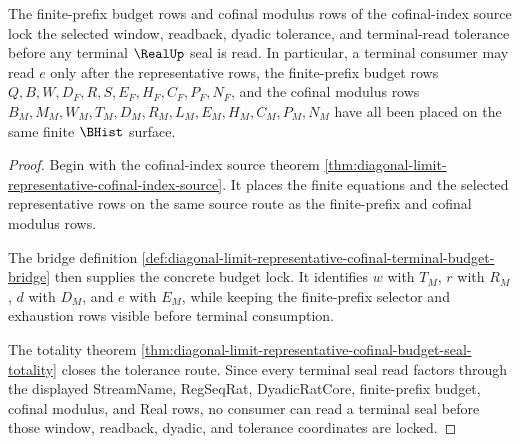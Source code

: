 \begin{theorem}
\label{thm:diagonal-limit-representative-cofinal-index-budget-lock}
The finite-prefix budget rows and cofinal modulus rows of the cofinal-index source lock the selected window, readback, dyadic tolerance, and terminal-read tolerance before any terminal $\RealUp$ seal is read. In particular, a terminal consumer may read $e$ only after the representative rows, the finite-prefix budget rows $Q,B,W,D_F,R,S,E_F,H_F,C_F,P_F,N_F$, and the cofinal modulus rows $B_M,M_M,W_M,T_M,D_M,R_M,L_M,E_M,H_M,C_M,P_M,N_M$ have all been placed on the same finite $\BHist$ surface.
\end{theorem}
\begin{proof}
Begin with the cofinal-index source theorem \autoref{thm:diagonal-limit-representative-cofinal-index-source}. It places the finite equations and the selected representative rows on the same source route as the finite-prefix and cofinal modulus rows.

The bridge definition \autoref{def:diagonal-limit-representative-cofinal-terminal-budget-bridge} then supplies the concrete budget lock. It identifies $w$ with $T_M$, $r$ with $R_M$, $d$ with $D_M$, and $e$ with $E_M$, while keeping the finite-prefix selector and exhaustion rows visible before terminal consumption.

The totality theorem \autoref{thm:diagonal-limit-representative-cofinal-budget-seal-totality} closes the tolerance route. Since every terminal seal read factors through the displayed StreamName, RegSeqRat, DyadicRatCore, finite-prefix budget, cofinal modulus, and Real rows, no consumer can read a terminal seal before those window, readback, dyadic, and tolerance coordinates are locked.
\end{proof}

